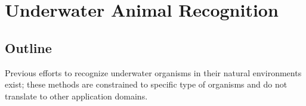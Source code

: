 \documentclass {udthesis}
\begin{document}

\chapter{Underwater Animal Recognition}	\label{chap:animal_lit}


\section{Outline}

Previous efforts to recognize underwater organisms in their natural environments exist; these methods are constrained to specific type of organisms and do not translate to other application domains.
\end{document}
